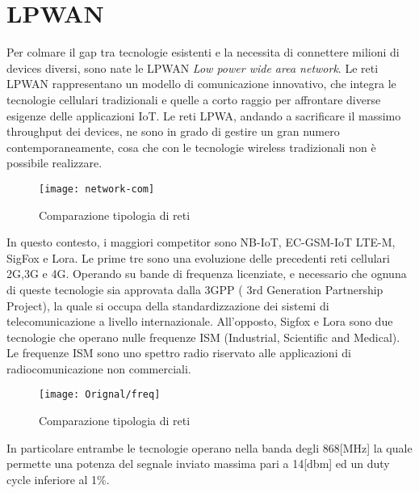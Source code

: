 \section{LPWAN}
Per colmare il gap tra tecnologie esistenti e la
necessita di connettere milioni di devices diversi, sono nate le  LPWAN
\emph{Low power wide area network}.
Le reti LPWAN rappresentano un modello  di comunicazione
innovativo, che integra le tecnologie cellulari tradizionali e quelle a corto
raggio per affrontare diverse esigenze delle applicazioni IoT. 
Le reti LPWA, andando a sacrificare il massimo throughput dei devices, ne sono in
grado di gestire un gran numero contemporaneamente, cosa che con le tecnologie
wireless tradizionali non è possibile realizzare.

\begin{figure}[h]
    \centering 
        \texttt{[image: network-com]}
    \caption{Comparazione tipologia di reti}
\end{figure}

In questo contesto, i maggiori competitor sono  NB-IoT, EC-GSM-IoT
LTE-M, SigFox e Lora. Le prime tre  sono una evoluzione delle precedenti reti
cellulari 2G,3G e 4G. Operando su bande di frequenza licenziate, e necessario
che ognuna di queste tecnologie sia approvata dalla 3GPP ( 3rd Generation
Partnership Project), la quale si occupa della standardizzazione dei sistemi di
telecomunicazione a livello internazionale.
All'opposto, Sigfox e Lora sono due tecnologie che operano nulle frequenze ISM
(Industrial, Scientific and Medical). Le frequenze ISM sono uno spettro radio
riservato alle applicazioni di radiocomunicazione non commerciali.

\begin{figure}[h]
    \centering 
        \texttt{[image: Orignal/freq]}
    \caption{Comparazione tipologia di reti}
\end{figure}

In particolare entrambe le tecnologie operano  nella banda degli 868[MHz]
la quale permette una potenza del segnale inviato massima pari a 14[dbm] ed un
duty cycle inferiore al 1\%.
 
